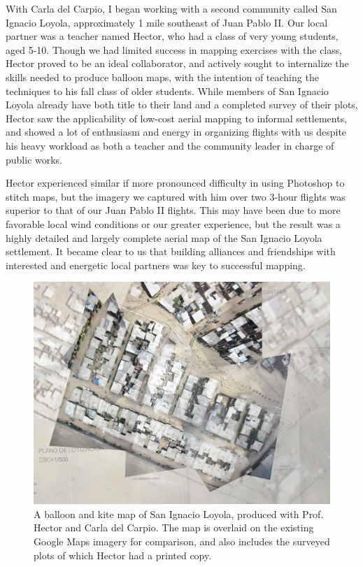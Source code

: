 \documentclass[11pt,oneside,notitlepage]{report}
\begin{document}
With Carla del Carpio, I began working with a second community called San Ignacio Loyola, approximately 1 mile southeast of Juan Pablo II. Our local partner was a teacher named Hector, who had a class of very young students, aged 5-10. Though we had limited success in mapping exercises with the class, Hector proved to be an ideal collaborator, and actively sought to internalize the skills needed to produce balloon maps, with the intention of teaching the techniques to his fall class of older students. While members of San Ignacio Loyola already have both title to their land and a completed survey of their plots, Hector saw the applicability of low-cost aerial mapping to informal settlements, and showed a lot of enthusiasm and energy in organizing flights with us despite his heavy workload as both a teacher and the community leader in charge of public works. 

Hector experienced similar if more pronounced difficulty in using Photoshop to stitch maps, but the imagery we captured with him over two 3-hour flights was superior to that of our Juan Pablo II flights. This may have been due to more favorable local wind conditions or our greater experience, but the result was a highly detailed and largely complete aerial map of the San Ignacio Loyola settlement. It became clear to us that building alliances and friendships with interested and energetic local partners was key to successful mapping.

\begin{figure}[h]
  \begin{center}
	\includegraphics[width=1\textwidth]{images/san-ignacio-loyola-map.jpg}
	\caption{A balloon and kite map of San Ignacio Loyola, produced with Prof. Hector and Carla del Carpio. The map is overlaid on the existing Google Maps imagery for comparison, and also includes the surveyed plots of which Hector had a printed copy.}
  \end{center}
\end{figure}
\end{document}
